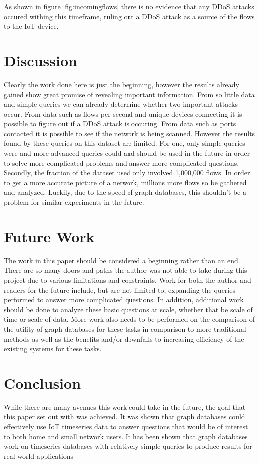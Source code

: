 \documentclass[conference]{IEEEtran}
\begin{document}
As shown in figure \ref{fig:incomingflows} there is no evidence that any DDoS attacks occured withing this timeframe,
ruling out a DDoS attack as a source of the flows to the IoT device. 

\section{Discussion}

Clearly the work done here is just the beginning, however the results already gained show great promise of revealing
important information. From so little data and simple queries we can already determine whether two important attacks
occur. From data such as flows per second and unique devices connecting it is possible to figure out if a DDoS attack
is occuring. From data such as ports contacted it is possible to see if the network is being scanned.
However the results found by these queries on this dataset are limited. For one, only simple queries were
and more advanced queries could and should be used in the future in order to solve more complicated problems and
answer more complicated questions. Secondly, the fraction of the dataset used only involved 1,000,000 flows. In
order to get a more accurate picture of a network, millions more flows so be gathered and analyzed. Luckily,
due to the speed of graph databases, this shouldn't be a problem for similar experiments in the future. 

\section{Future Work}

The work in this paper should be considered a beginning rather than an end. There are so many doors and paths
the author was not able to take during this project due to various limitations and constraints. Work for both
the author and readers for the future include, but are not limited to, expanding the queries performed to answer
more complicated questions. In addition, additional work should be done to analyze these basic questions at scale,
whether that be scale of time or scale of data. More work also needs to be performed on the comparison of the
utility of graph databases for these tasks in comparison to more traditional methods as well as the benefits
and/or downfalls to increasing efficiency of the existing systems for these tasks.

\section{Conclusion}
While there are many avenues this work could take in the future, the goal that this paper set out with was
achieved. It was shown that graph databases could effectively use IoT timeseries data to answer questions
that would be of interest to both home and small network users. It has been shown that graph databases work
on timeseries databases with relatively simple queries to produce results for real world applications

\printbibliography
\end{document}
